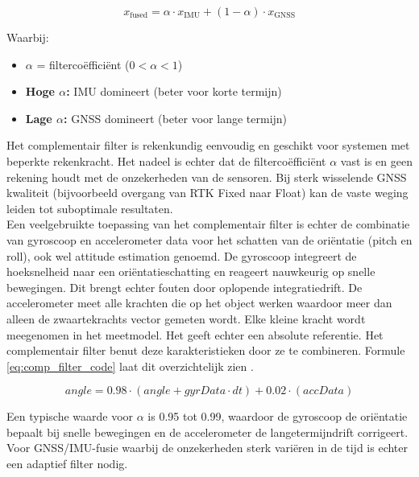\begin{equation} 
	\label{eq:complementary_filter}
    x_{\text{fused}} = \alpha \cdot x_{\text{IMU}} + (1 - \alpha) \cdot x_{\text{GNSS}}
\end{equation}

Waarbij:
\begin{itemize}
    \item $\alpha$ = filtercoëfficiënt ($0 < \alpha < 1$)
	\item \textbf{Hoge $\alpha$:} IMU domineert (beter voor korte termijn)
	\item \textbf{Lage $\alpha$:} GNSS domineert (beter voor lange termijn)
\end{itemize}

Het complementair filter is rekenkundig eenvoudig en geschikt voor systemen met beperkte rekenkracht. Het nadeel is echter dat de filtercoëfficiënt $\alpha$ vast is en geen rekening houdt met de onzekerheden van de sensoren. Bij sterk wisselende GNSS kwaliteit (bijvoorbeeld overgang van RTK Fixed naar Float) kan de vaste weging leiden tot suboptimale resultaten. \\

Een veelgebruikte toepassing van het complementair filter is echter de combinatie van gyroscoop en accelerometer data voor het schatten van de oriëntatie (pitch en roll), ook wel attitude estimation genoemd. De gyroscoop integreert de hoeksnelheid naar een oriëntatieschatting en reageert nauwkeurig op snelle bewegingen. Dit brengt echter fouten door oplopende integratiedrift. De accelerometer meet alle krachten die op het object werken waardoor meer dan alleen de zwaartekrachts vector gemeten wordt. Elke kleine kracht wordt meegenomen in het meetmodel. Het geeft echter een absolute referentie. Het complementair filter benut deze karakteristieken door ze te combineren. Formule \ref{eq:comp_filter_code} laat dit overzichtelijk zien \cite{pieterjan_complementary}.

\begin{equation} \label{eq:comp_filter_code}
    \mathit{angle} = 0.98 \cdot (\mathit{angle} + \mathit{gyrData} \cdot dt) + 0.02 \cdot (\mathit{accData})
\end{equation}
\vspace{0.1cm}

Een typische waarde voor $\alpha$ is 0.95 tot 0.99, waardoor de gyroscoop de oriëntatie bepaalt bij snelle bewegingen en de accelerometer de langetermijndrift corrigeert. Voor GNSS/IMU-fusie waarbij de onzekerheden sterk variëren in de tijd is echter een adaptief filter nodig. 

